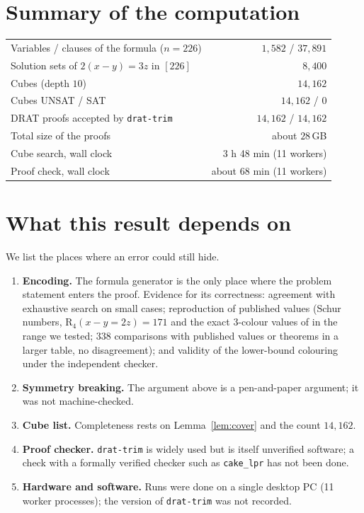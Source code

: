 \documentclass[11pt,a4paper]{article}
\theoremstyle{remark}
\newcommand{\R}{\mathrm{R}}
\begin{document}
\section{Summary of the computation}
\begin{center}
\begin{tabular}{@{}lr@{}}
\toprule
Variables / clauses of the formula ($n=226$) & $1{,}582$ / $37{,}891$ \\
Solution sets of $2(x-y)=3z$ in $[226]$ & $8{,}400$ \\
Cubes (depth $10$) & $14{,}162$ \\
Cubes UNSAT / SAT & $14{,}162$ / $0$ \\
DRAT proofs accepted by \texttt{drat-trim} & $14{,}162$ / $14{,}162$ \\
Total size of the proofs & about $28$\,GB \\
Cube search, wall clock & 3 h 48 min (11 workers) \\
Proof check, wall clock & about 68 min (11 workers) \\
\bottomrule
\end{tabular}
\end{center}

\section{What this result depends on}
We list the places where an error could still hide.
\begin{enumerate}
\item \textbf{Encoding.} The formula generator is the only place where the problem statement enters the proof. Evidence for its
 correctness: agreement with exhaustive search on small cases; reproduction of published values
 (Schur numbers, $\R_4(x-y=2z)=171$ and the exact $3$-colour values of \cite{CDW22} in the range we tested; $338$ comparisons with
 published values or theorems in a larger table, no disagreement); and validity of the lower-bound colouring under the independent checker.
\item \textbf{Symmetry breaking.} The argument above is a pen-and-paper argument; it was not machine-checked.
\item \textbf{Cube list.} Completeness rests on Lemma~\ref{lem:cover} and the count $14{,}162$.
\item \textbf{Proof checker.} \texttt{drat-trim} is widely used but is itself unverified software; a check with a formally verified
 checker such as \texttt{cake\_lpr} \cite{THM21} has not been done.
\item \textbf{Hardware and software.} Runs were done on a single desktop PC (11 worker processes); the version of \texttt{drat-trim} was not recorded.
\end{enumerate}
\end{document}
